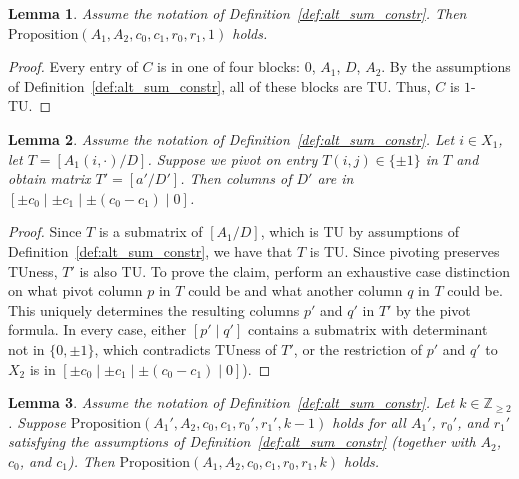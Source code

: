 \documentclass{article}
\newtheorem{lemma}{Lemma}
\theoremstyle{definition}
\begin{document}
\begin{lemma}\label{lem:alt_1_TU}
    Assume the notation of Definition~\ref{def:alt_sum_constr}. Then $\mathrm{Proposition}(A_{1}, A_{2}, c_{0}, c_{1}, r_{0}, r_{1}, 1)$ holds.
\end{lemma}

\begin{proof}
    Every entry of $C$ is in one of four blocks: $0$, $A_{1}$, $D$, $A_{2}$. By the assumptions of Definition~\ref{def:alt_sum_constr}, all of these blocks are TU. Thus, $C$ is $1$-TU.
\end{proof}

\begin{lemma}\label{lem:alt_three_sum_pivot}
    Assume the notation of Definition~\ref{def:alt_sum_constr}. Let $i \in X_{1}$, let $T = [A_{1} (i, \cdot) / D]$. Suppose we pivot on entry $T (i, j) \in \{\pm 1\}$ in $T$ and obtain matrix $T' = [a' / D']$. Then columns of $D'$ are in $[\pm c_{0} \mid \pm c_{1} \mid \pm (c_{0} - c_{1}) \mid 0]$.
\end{lemma}

\begin{proof}
    Since $T$ is a submatrix of $[A_{1} / D]$, which is TU by assumptions of Definition~\ref{def:alt_sum_constr}, we have that $T$ is TU. Since pivoting preserves TUness, $T'$ is also TU. To prove the claim, perform an exhaustive case distinction on what pivot column $p$ in $T$ could be and what another column $q$ in $T$ could be. This uniquely determines the resulting columns $p'$ and $q'$ in $T'$ by the pivot formula. In every case, either $[p' \mid q']$ contains a submatrix with determinant not in $\{0, \pm 1\}$, which contradicts TUness of $T'$, or the restriction of $p'$ and $q'$ to $X_{2}$ is in $[\pm c_{0} \mid \pm c_{1} \mid \pm (c_{0} - c_{1}) \mid 0]$).
\end{proof}

\begin{lemma}\label{lem:alt_k_TU_induction}
    Assume the notation of Definition~\ref{def:alt_sum_constr}. Let $k \in \mathbb{Z}_{\geq 2}$. Suppose $\mathrm{Proposition}(A_{1}', A_{2}, c_{0}, c_{1}, r_{0}', r_{1}', k - 1)$ holds for all $A_{1}'$, $r_{0}'$, and $r_{1}'$ satisfying the assumptions of Definition~\ref{def:alt_sum_constr} (together with $A_{2}$, $c_{0}$, and $c_{1}$). Then $\mathrm{Proposition}(A_{1}, A_{2}, c_{0}, c_{1}, r_{0}, r_{1}, k)$ holds.
\end{lemma}
\end{document}
